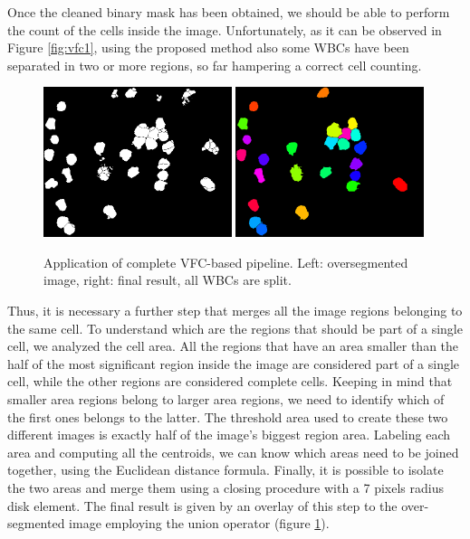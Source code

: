 {	Once the cleaned binary mask has been obtained, we should be able to perform the count of the cells inside the image. Unfortunately, as it can be observed in Figure \ref{fig:vfc1}, using the proposed method also some WBCs have been separated in two or more regions, so far hampering a correct cell counting.
	
	\begin{figure}[!b]
		\centering
		\includegraphics[width=0.49\textwidth]{images/2018_1_visapp/figure8.png}
		\includegraphics[width=0.49\textwidth]{images/2018_1_visapp/detection.png}
		\caption[Complete VFC detection.]{\label{fig:vfc2}Application of complete VFC-based pipeline. Left: oversegmented image, right: final result, all WBCs are split.}
	\end{figure}
	Thus, it is necessary a further step that merges all the image regions belonging to the same cell. To understand which are the regions that should be part of a single cell, we analyzed the cell area.
	All the regions that have an area smaller than the half of the most significant region inside the image are considered part of a single cell, while the other regions are considered complete cells.
	Keeping in mind that smaller area regions belong to larger area regions, we need to identify which of the first ones belongs to the latter. The threshold area used to create these two different images is exactly half of the image's biggest region area. Labeling each area and computing all the centroids, we can know which areas need to be joined together, using the Euclidean distance formula. Finally, it is possible to isolate the two areas and merge them using a closing procedure with a 7 pixels radius disk element. The final result is given by an overlay of this step to the over-segmented image employing the union operator (figure \ref{fig:vfc2}).
	
}

